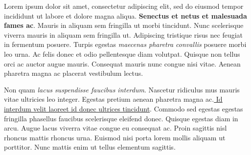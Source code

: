 \par
\begin{flushleft}
Lorem ipsum dolor sit amet, consectetur adipiscing elit, sed do eiusmod tempor incididunt ut labore et dolore magna aliqua. \textbf{Senectus et netus et malesuada fames ac}. Mauris in aliquam sem fringilla ut morbi tincidunt. Nunc scelerisque viverra mauris in aliquam sem fringilla ut. Adipiscing tristique risus nec feugiat in fermentum posuere. Turpis egestas \textit{maecenas pharetra convallis} posuere morbi leo urna. Ac felis donec et odio pellentesque diam volutpat. Quisque non tellus orci ac auctor augue mauris. Consequat mauris nunc congue nisi vitae. Aenean pharetra magna ac placerat vestibulum lectus.
\end{flushleft}
\begin{flushright}
\par
Non quam \emph{lacus suspendisse faucibus interdum}. Nascetur ridiculus mus mauris vitae ultricies leo integer. Egestas pretium aenean pharetra magna ac.\underline{ Id interdum velit laoreet id donec ultrices tincidunt}. Commodo sed egestas egestas fringilla phasellus faucibus scelerisque eleifend donec. Quisque egestas diam in arcu. Augue lacus viverra vitae congue eu consequat ac. Proin sagittis nisl rhoncus mattis rhoncus urna. Euismod nisi porta lorem mollis aliquam ut porttitor. Nunc mattis enim ut tellus elementum sagittis.
\end{flushright}

